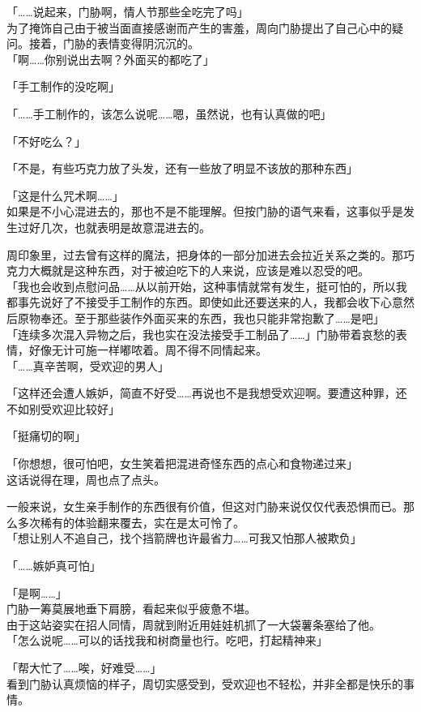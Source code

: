 「……说起来，门胁啊，情人节那些全吃完了吗」\\

为了掩饰自己由于被当面直接感谢而产生的害羞，周向门胁提出了自己心中的疑问。接着，门胁的表情变得阴沉沉的。\\

「啊……你别说出去啊？外面买的都吃了」

「手工制作的没吃啊」

「……手工制作的，该怎么说呢……嗯，虽然说，也有认真做的吧」

「不好吃么？」

「不是，有些巧克力放了头发，还有一些放了明显不该放的那种东西」

「这是什么咒术啊……」\\

如果是不小心混进去的，那也不是不能理解。但按门胁的语气来看，这事似乎是发生过好几次，也就表明是故意混进去的。

周印象里，过去曾有这样的魔法，把身体的一部分加进去会拉近关系之类的。那巧克力大概就是这种东西，对于被迫吃下的人来说，应该是难以忍受的吧。\\

「我也会收到点慰问品……从以前开始，这种事情就常有发生，挺可怕的，所以我都事先说好了不接受手工制作的东西。即使如此还要送来的人，我都会收下心意然后原物奉还。至于那些装作外面买来的东西，我也只能非常抱歉了……是吧」\\

「连续多次混入异物之后，我也实在没法接受手工制品了……」门胁带着哀愁的表情，好像无计可施一样嘟哝着。周不得不同情起来。\\

「……真辛苦啊，受欢迎的男人」

「这样还会遭人嫉妒，简直不好受……再说也不是我想受欢迎啊。要遭这种罪，还不如别受欢迎比较好」

「挺痛切的啊」

「你想想，很可怕吧，女生笑着把混进奇怪东西的点心和食物递过来」\\

这话说得在理，周也点了点头。

一般来说，女生亲手制作的东西很有价值，但这对门胁来说仅仅代表恐惧而已。那么多次稀有的体验翻来覆去，实在是太可怜了。\\

「想让别人不追自己，找个挡箭牌也许最省力……可我又怕那人被欺负」

「……嫉妒真可怕」

「是啊……」\\

门胁一筹莫展地垂下肩膀，看起来似乎疲惫不堪。\\

由于这站姿实在招人同情，周就到附近用娃娃机抓了一大袋薯条塞给了他。\\

「怎么说呢……可以的话找我和树商量也行。吃吧，打起精神来」

「帮大忙了……唉，好难受……」\\

看到门胁认真烦恼的样子，周切实感受到，受欢迎也不轻松，并非全都是快乐的事情。

